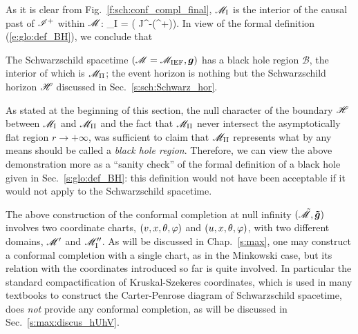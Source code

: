 As it is clear from Fig.~\ref{f:sch:conf_compl_final}, $\mathscr{M}_{\rm I}$
is the interior of the causal past of $\mathscr{I}^+$ within $\mathscr{M}$:
\be
    \M_{\rm I} = \left( J^-(\scri^+)\cap\M \right).
\ee
In view of the formal definition (\ref{e:glo:def_BH}), we conclude that
\begin{greybox}
The Schwarzschild spacetime $(\mathscr{M}=\mathscr{M}_{\rm IEF}, \bm{g})$
has a black hole region $\mathscr{B}$, the interior
of which is $\mathscr{M}_{\rm II}$; the event horizon is nothing but the
Schwarzschild horizon $\mathscr{H}$ discussed in Sec.~\ref{s:sch:Schwarz_hor}.
\end{greybox}

\begin{remark}
As stated at the beginning of this section, the null character of the boundary
$\mathscr{H}$ between $\mathscr{M}_{\rm I}$ and $\mathscr{M}_{\rm II}$ and the fact that
$\mathscr{M}_{\rm II}$ never intersect the asymptotically flat region $r\rightarrow +\infty$,
was sufficient to claim that $\mathscr{M}_{\rm II}$ represents what by any means should be
called a \emph{black hole region}.
Therefore, we can view the above demonstration more as a ``sanity check''
of the formal definition of a black hole given in Sec.~\ref{s:glo:def_BH}:
this definition would not have been acceptable if it would not
apply to the Schwarzschild spacetime.
\end{remark}

\begin{remark}
The above construction of the conformal completion at null infinity
$(\tilde{\mathscr{M}},\bm{\tilde{g}})$ involves two coordinate charts,
$(v,x,\theta,\varphi)$ and $(u,x,\theta,\varphi)$, with two different
domains, $\mathscr{M}'$ and $\mathscr{M}''_{\rm I}$.
As will be discussed in Chap.~\ref{s:max},
one may construct a conformal completion
with a single chart, as in the Minkowski case, but its relation with
the coordinates introduced so far is quite involved.
In particular the standard compactification of Kruskal-Szekeres coordinates,
which is used in many textbooks to construct the Carter-Penrose diagram
of Schwarzschild spacetime, does \emph{not} provide any
conformal completion, as will be discussed in
Sec.~\ref{s:max:discus_hUhV}.
\end{remark}



